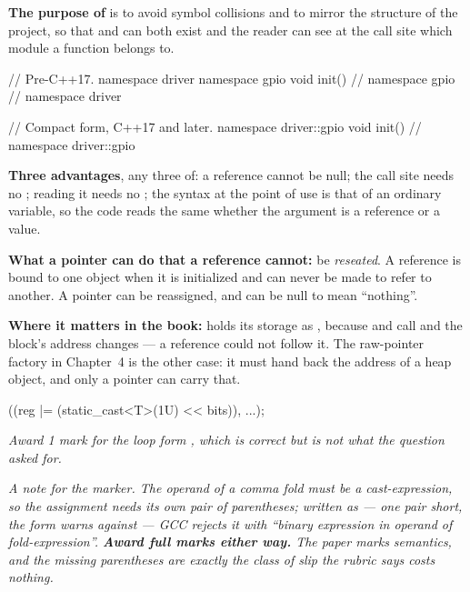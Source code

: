 \textbf{The purpose of } is to avoid symbol collisions and to mirror the
structure of the project, so that  and  can
both exist and the reader can see at the call site which module a function belongs to. 

\begin{cppcode}
// Pre-C++17.
namespace driver
{
namespace gpio
{
void init() {}
} // namespace gpio
} // namespace driver

// Compact form, C++17 and later.
namespace driver::gpio
{
void init() {}
} // namespace driver::gpio
\end{cppcode}
\noindent{}

\textbf{Three advantages}, any three of: a reference cannot be null; the call site needs no
\code{&}; reading it needs no \code{*}; the syntax at the point of use is that of an ordinary
variable, so the code reads the same whether the argument is a reference or a value. 

\textbf{What a pointer can do that a reference cannot:} be \emph{reseated}. A reference is bound to
one object when it is initialized and can never be made to refer to another. A pointer can be
reassigned, and can be null to mean ``nothing''.

\textbf{Where it matters in the book:}  holds its storage as
, because  and  call  and the
block's address changes --- a reference could not follow it. The raw-pointer factory in Chapter~4
is the other case: it must hand back the address of a heap object, and only a pointer can carry
that. 

\begin{cppcode}
((reg |= (static_cast<T>(1U) << bits)), ...);
\end{cppcode}
\noindent{}

{\itshape Award 1 mark for the loop form , which is correct
but is not what the question asked for.\par}

\medskip
{\itshape A note for the marker. The operand of a comma fold must be a cast-expression, so the
assignment needs its own pair of parentheses; written as
 --- one pair short, the form
 warns against --- GCC rejects it with ``binary expression in operand of
fold-expression''. \textbf{Award full marks either way.} The paper marks semantics, and the missing
parentheses are exactly the class of slip the rubric says costs nothing.\par}


